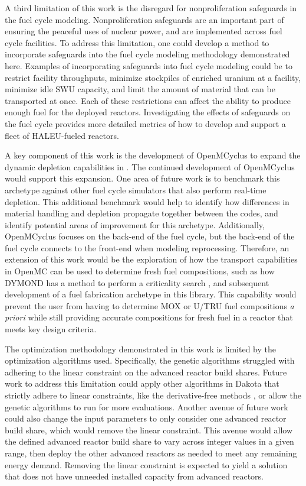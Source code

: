 A third limitation of this work is the disregard for nonproliferation 
safeguards in the fuel cycle modeling. Nonproliferation safeguards 
are an important part of ensuring the peaceful uses of nuclear 
power, and are implemented across fuel cycle facilities. To 
address this limitation, one could develop 
a method to incorporate safeguards into the fuel cycle modeling
methodology demonstrated here. 
Examples of incorporating safeguards into fuel cycle modeling could 
be to restrict facility throughputs, minimize stockpiles of 
enriched uranium at a facility, minimize idle \gls{SWU} 
capacity, and limit the amount of material that can be transported 
at once. Each of these restrictions can affect the ability 
to produce enough fuel for the deployed reactors. Investigating 
the effects of safeguards on the fuel cycle provides more 
detailed metrics of how to develop and support a fleet of 
\gls{HALEU}-fueled reactors. 

A key component of this work is the development of OpenMCyclus 
to expand the dynamic depletion capabilities in \Cyclus. The 
continued development of OpenMCyclus would support this expansion.  
One area of future work is to benchmark this archetype against 
other fuel cycle simulators that also perform real-time 
depletion. This additional benchmark would help to identify 
how differences in material handling and depletion 
propagate together between the codes, and identify potential 
areas of improvement for this archetype. 
Additionally, OpenMCyclus focuses on the back-end of 
the fuel cycle, but the back-end of the fuel cycle connects 
to the front-end when modeling reprocessing. Therefore, an 
extension of this work would be the
exploration of how the transport capabilities in OpenMC can 
be used to determine fresh fuel compositions, such as 
how \gls{DYMOND} has a method to perform a criticality search 
\cite{richards_application_2021}, and subsequent development 
of a fuel fabrication archetype in this library. 
This capability would prevent the user from having to determine 
\gls{MOX} or U/TRU fuel compositions \textit{a priori} while 
still providing accurate compositions for fresh fuel in a 
reactor that meets key design criteria.  

The optimization methodology demonstrated in this work is 
limited by the optimization algorithms used. Specifically, the 
genetic algorithms struggled with adhering to the linear constraint 
on the advanced reactor build shares. Future work to address this 
limitation could apply other algorithms in Dakota that strictly 
adhere to linear constraints, like the derivative-free methods 
\cite{adams_dakota_2021}, or allow the genetic algorithms to 
run for more evaluations. Another avenue of future work could 
also change the input parameters to only consider one advanced 
reactor build share, which would remove the linear constraint. 
This avenue would allow the defined advanced reactor build share to 
vary across integer values in a given range, then deploy the other 
advanced reactors as needed to meet any 
remaining energy demand. Removing the linear constraint is 
expected to yield a solution that does not have unneeded installed 
capacity from advanced reactors. 

